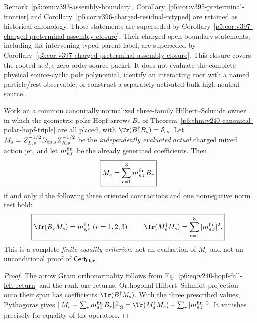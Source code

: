 \documentclass[12pt,a4paper]{article}
\begin{document}
\begin{remark}
\label{p5:rem:v397-supersede-charged-boundary}
Remark~\ref{p5:rem:v393-assembly-boundary},
Corollary~\ref{p5:cor:v395-preterminal-frontier} and
Corollary~\ref{p5:cor:v396-charged-residual-retyped} are retained as historical
chronology.  Those statements are superseded by Corollary~\ref{p5:cor:v397-charged-preterminal-assembly-closure}.
Their charged open-boundary statements, including the intervening typed-parent
label, are superseded by
Corollary~\ref{p5:cor:v397-charged-preterminal-assembly-closure}.
This closure covers the rooted $u,d,e$ zero-order source packet. It does not
evaluate the complete physical source-cyclic pole polynomial, identify an
interacting root with a named particle/rest observable, or construct a
separately activated bulk high-neutral source.
\end{remark}

\begin{proposition}
\label{p5:prop:v245-charged-four-invariant-source-test}
Work on a common canonically normalized three-family Hilbert--Schmidt
owner in which the geometric polar Hopf arrows $B_r$ of
Theorem~\ref{p6:thm:v240-canonical-polar-hopf-triple} are all placed,
with $\Tr(B_r^\dagger B_s)=\delta_{rs}$. Let
$M_s=Z_{L,s}^{-1/2}D_{{\rm ch},s}Z_{R,s}^{-1/2}$ be the
\emph{independently evaluated actual} charged mixed action jet, and let
$m_{s,r}^{\rm fin}$ be the already generated coefficients. Then
\[
 \boxed{M_s=\sum_{r=1}^3m_{s,r}^{\rm fin}B_r}
\]
if and only if the following three oriented contractions and one
nonnegative norm test hold:
\[
 \boxed{\Tr(B_r^\dagger M_s)=m_{s,r}^{\rm fin}\ (r=1,2,3),
 \qquad \Tr(M_s^\dagger M_s)
 =\sum_{r=1}^3|m_{s,r}^{\rm fin}|^2.}
\]
This is a complete \emph{finite equality criterion}, not an evaluation
of $M_s$ and not an unconditional proof of $\mathsf{Cert}_{\rm hier}$.
\end{proposition}
\begin{proof}
The arrow Gram orthonormality follows from
Eq.~\eqref{p6:eq:v240-hopf-full-left-return} and the rank-one returns.
Orthogonal Hilbert--Schmidt projection onto their span has coefficients
$\Tr(B_r^\dagger M_s)$. With the three prescribed values,
Pythagoras gives
$\|M_s-\sum_rm_{s,r}^{\rm fin}B_r\|_{\rm HS}^2
=\Tr(M_s^\dagger M_s)-\sum_r|m_{s,r}^{\rm fin}|^2$.
It vanishes precisely for equality of the operators.
\end{proof}
\end{document}
